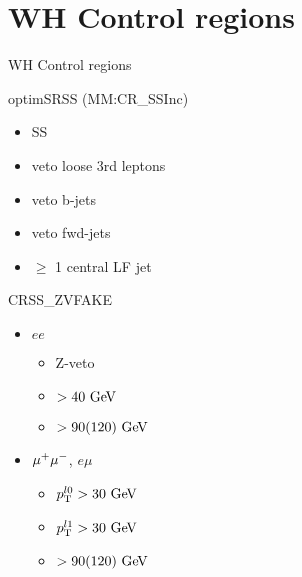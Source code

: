 \documentclass[10pt]{beamer}
\begin{document}
\section{WH Control regions}
\begin{frame}{WH Control regions}

  \begin{block}{optimSRSS (MM:CR\_SSInc)}
    \begin{itemize}
    \item SS
    \item veto loose 3rd leptons
    \item veto b-jets
    \item veto fwd-jets
    \item $\ge$ 1 central LF jet      
    \end{itemize}
  \end{block}

  \begin{block}{CRSS\_ZVFAKE}
    \begin{itemize}    
    \item $ee$
      \begin{itemize}
      \item Z-veto
      \item \METrel$>40 \GeV$
      \item \mljj$>90(120)\GeV$
      \end{itemize}
    \item $\mathrm{\mu^+ \mu^-}$, $e\mu$
      \begin{itemize}
      \item $\pT^{l0}>30\GeV$
      \item $\pT^{l1}>30\GeV$
      \item \mljj$>90(120)\GeV$
      \end{itemize}
    \end{itemize}
  \end{block}

\end{frame}
\end{document}
